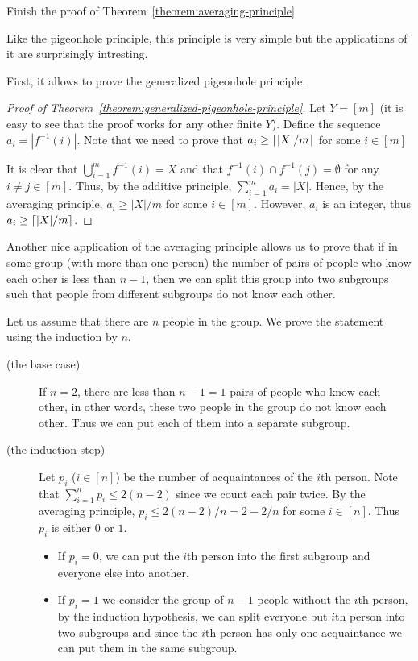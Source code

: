 \begin{exercise}
  Finish the proof of Theorem~\ref{theorem:averaging-principle}
\end{exercise}

Like the pigeonhole principle, this principle is very simple but the
applications of it are surprisingly intresting.

First, it allows to prove the generalized pigeonhole principle.
\begin{proof}[Proof of Theorem~\ref{theorem:generalized-pigeonhole-principle}]
  Let $Y = [m]$ (it is easy to see that the proof works for any other finite
  $Y$). Define the sequence $a_i = |f^{-1}(i)|$. %
  Note that we need to prove that $a_i \ge \left\lceil {|X| / m} \right\rceil$ for some
  $i \in [m]$

  It is clear that $\bigcup_{i = 1}^m f^{-1}(i) = X$ and that $f^{-1}(i) \cap
  f^{-1}(j) = \emptyset$ for any $i \neq j \in [m]$. Thus, by the additive
  principle, $\sum_{i = 1}^m a_i = |X|$. Hence, by the averaging principle,
  $a_i \ge |X| / m$ for some $i \in [m]$. However, $a_i$ is an integer, thus
  $a_i \ge \left\lceil {|X| / m} \right\rceil$.
\end{proof}

Another nice application of the averaging principle allows us to prove that if
in some group (with more than one person) the number of pairs of people who
know each other is less than $n - 1$, then we can split this group into two
subgroups such that people from different subgroups do not know each other.

Let us assume that there are $n$ people in the group. We prove the statement
using the induction by $n$.
\begin{description}
  \item [(the base case)] If $n = 2$, there are less than $n - 1 = 1$ pairs
    of people who know each other, in other words, these two people in the
    group do not know each other. Thus we can put each of them into a separate
    subgroup.
  \item [(the induction step)] Let $p_i$ ($i \in [n]$) be the number of
    acquaintances of the $i$th person. Note that
    $\sum_{i = 1}^n p_i \le 2(n - 2)$ since we count each pair twice.
    By the averaging principle, $p_i \le 2(n - 2) / n = 2 - 2 / n$ for some
    $i \in [n]$.  Thus $p_i$ is either $0$ or $1$.
    \begin{itemize}
      \item If $p_i = 0$, we can put the $i$th person into the first subgroup
        and everyone else into another.
      \item If $p_i = 1$ we consider the group of $n - 1$ people without the
        $i$th person, by the induction hypothesis, we can split everyone but
        $i$th person into two subgroups and since the $i$th person has only one
        acquaintance we can put them in the same subgroup.
      \end{itemize}
\end{description}



